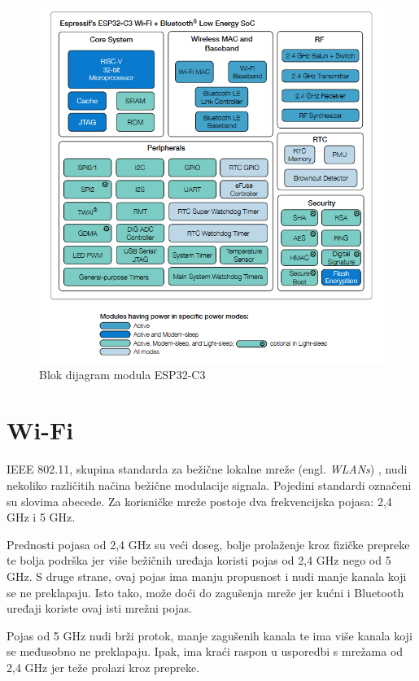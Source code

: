 \begin{figure}[ht]
	\centering
	\includegraphics[scale=0.6]{imgs/esp32block}
	\caption{Blok dijagram modula ESP32-C3 \cite{esp32manual}}
	\label{fig:esp32block}
\end{figure}

\section{Wi-Fi}

IEEE 802.11, skupina standarda za bežične lokalne mreže (engl. \textit{WLANs}) \cite{ieee}, nudi nekoliko različitih načina bežične modulacije signala. Pojedini standardi označeni su slovima abecede. Za korisničke mreže postoje dva frekvencijska pojasa: 2,4 GHz i 5 GHz. 

Prednosti pojasa od 2,4 GHz su veći doseg, bolje prolaženje kroz fizičke prepreke te bolja podrška jer više bežičnih uređaja koristi pojas od 2,4 GHz nego od 5 GHz. S druge strane, ovaj pojas ima manju propusnost i nudi manje kanala koji se ne preklapaju. Isto tako, može doći do zagušenja mreže jer kućni i Bluetooth uređaji koriste ovaj isti mrežni pojas.

Pojas od 5 GHz nudi brži protok, manje zagušenih kanala te ima više kanala koji se međusobno ne preklapaju. Ipak, ima kraći raspon u usporedbi s mrežama od 2,4 GHz jer teže prolazi kroz prepreke. \cite{microsoft_ieee} 

